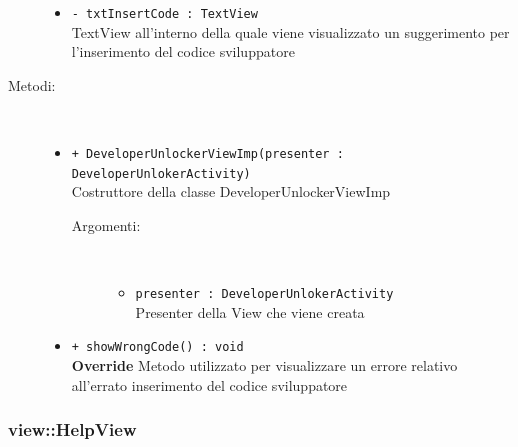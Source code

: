 \documentclass[../DefinizioneDiProdotto.tex]{subfiles}
\begin{document}
\begin{description}
\begin{itemize}
\item \texttt{- txtInsertCode : TextView}\\
TextView all'interno della quale viene visualizzato un suggerimento per l'inserimento del codice sviluppatore

\end{itemize}
\item[Metodi:] \
\begin{itemize}
\item \texttt{+ DeveloperUnlockerViewImp(presenter : DeveloperUnlokerActivity)}\\
Costruttore della classe DeveloperUnlockerViewImp
 \begin{description}
\item[Argomenti:] \
\begin{itemize}
\item \texttt{presenter : DeveloperUnlokerActivity}\\
Presenter della View che viene creata\end{itemize}
\end{description}
\item \texttt{+ showWrongCode() : void}\\
\textbf{Override} Metodo utilizzato per visualizzare un errore relativo all'errato inserimento del codice sviluppatore
 \end{itemize}
\end{description}

\subsubsection{view::HelpView}
\end{document}
